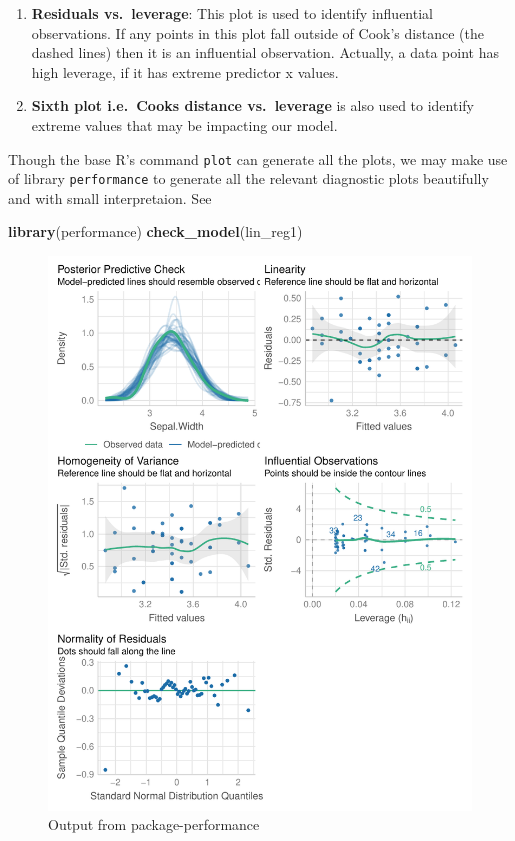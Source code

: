 \documentclass[
]{book}
\newenvironment{Shaded}{\begin{snugshade}}{\end{snugshade}}
\newcommand{\FunctionTok}[1]{\textcolor[rgb]{0.13,0.29,0.53}{\textbf{#1}}}
\newcommand{\NormalTok}[1]{#1}
\providecommand{\tightlist}{%
  \setlength{\itemsep}{0pt}\setlength{\parskip}{0pt}}
\begin{document}
\begin{enumerate}
\def\labelenumi{\arabic{enumi}.}
\setcounter{enumi}{4}
\tightlist
\item
  \textbf{Residuals vs.~leverage}: This plot is used to identify influential observations. If any points in this plot fall outside of Cook's distance (the dashed lines) then it is an influential observation. Actually, a data point has high leverage, if it has extreme predictor x values.
\item
  \textbf{Sixth plot i.e.~Cooks distance vs.~leverage} is also used to identify extreme values that may be impacting our model.
\end{enumerate}

Though the base R's command \texttt{plot} can generate all the plots, we may make use of library \texttt{performance} to generate all the relevant diagnostic plots beautifully and with small interpretaion. See

\begin{Shaded}
\begin{Highlighting}[]
\FunctionTok{library}\NormalTok{(performance)}
\FunctionTok{check\_model}\NormalTok{(lin\_reg1)}
\end{Highlighting}
\end{Shaded}

\begin{figure}

{\centering \includegraphics{DauR_files/figure-latex/perf-1} 

}

\caption{Output from package-performance}\label{fig:perf}
\end{figure}
\end{document}
